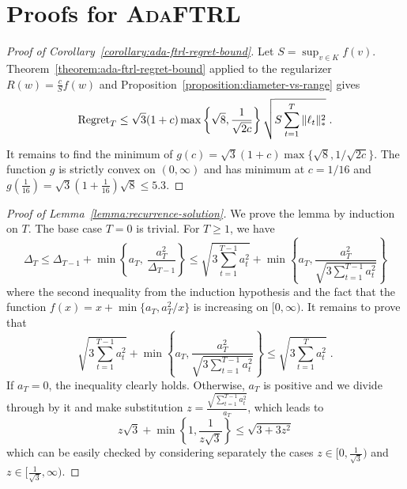 \section{Proofs for \textsc{AdaFTRL}}
\label{section:ada-ftrl-proofs}

\begin{proof}[Proof of Corollary~\ref{corollary:ada-ftrl-regret-bound}]
Let $S = \sup_{v \in K} f(v)$. Theorem~\ref{theorem:ada-ftrl-regret-bound}
applied to the regularizer $R(w) = \frac{c}{S} f(w)$ and
Proposition~\ref{proposition:diameter-vs-range} gives
$$
\operatorname{Regret}_T \le \sqrt{3}(1 + c) \max\left\{\sqrt{8}, \frac{1}{\sqrt{2c}} \right\} \sqrt{S \sum_{t=1}^T \|\ell_t\|_*^2} \; .
$$
It remains to find the minimum of $g(c) = \sqrt{3}(1 + c) \max\{\sqrt{8},
1/\sqrt{2c}\}$.  The function $g$ is strictly convex on $(0, \infty)$ and has
minimum at $c=1/16$ and $g(\frac{1}{16}) = \sqrt{3}(1+\frac{1}{16})\sqrt{8} \le
5.3$.
\end{proof}

\begin{proof}[Proof of Lemma~\ref{lemma:recurrence-solution}]
We prove the lemma by induction on $T$.  The base case $T=0$ is trivial. For $T
\ge 1$, we have
$$
\Delta_T
\le \Delta_{T-1} + \min \left\{a_T, \ \frac{a_T^2}{\Delta_{T-1}} \right\}
\le \sqrt{3 \sum_{t=1}^{T-1} a_t^2} + \min \left\{ a_T, \frac{a_T^2}{\sqrt{3 \sum_{t=1}^{T-1} a_t^2}} \right\}
$$
where the second inequality from the induction hypothesis and the fact that the
function $f(x) = x + \min\{a_T, a_T^2/x\}$ is increasing on $[0,\infty)$.  It
remains to prove that
$$
\sqrt{3 \sum_{t=1}^{T-1} a_t^2} + \min \left\{ a_T, \frac{a_T^2}{\sqrt{3 \sum_{t=1}^{T-1} a_t^2}} \right\}
\le  \sqrt{3 \sum_{t=1}^T a_t^2} \; .
$$
If $a_T = 0$, the inequality clearly holds. Otherwise, $a_T$ is positive and we
divide through by it and make substitution $z=\frac{\sqrt{\sum_{t=1}^{T-1}
a_t^2}}{a_T}$, which leads to
$$
z\sqrt{3} + \min\left\{1,\frac{1}{z\sqrt{3}}\right\} \le \sqrt{3 + 3z^2}
$$
which can be easily checked by considering separately the cases $z \in
[0,\frac{1}{\sqrt{3}})$ and $z \in [\frac{1}{\sqrt{3}}, \infty)$.
\end{proof}
